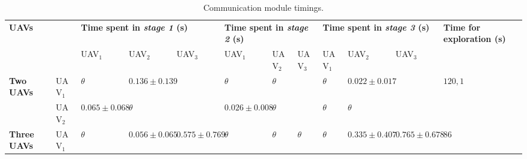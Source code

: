 \documentclass[11pt,openany]{book}
\begin{document}
\begin{table}[H]
    \centering
    \small
    \caption{Communication module timings.}
    \label{tab:4.4}
    \begin{tabular}{|p{0.8cm}|p{0.7cm}|p{0.7cm}|p{0.7cm}|p{0.7cm}|p{0.7cm}|p{0.7cm}|p{0.7cm}|p{0.7cm}|p{0.7cm}|p{0.7cm}|p{1cm}|}\hline
        \multicolumn{2}{|l|}{\multirow{2}{1cm}{\textbf{UAVs}}} & \multicolumn{3}{|p{2.1cm}|}{\textbf{Time spent in \textit{stage 1} (s)}} & \multicolumn{3}{|p{2.1cm}|}{\textbf{Time spent in \textit{stage 2} (s)}} & \multicolumn{3}{|p{2.1cm}|}{\textbf{Time spent in \textit{stage 3} (s)}} & \textbf{Time for exploration (s)}                                                                                                                      \\\cline{3-11}
        \multicolumn{2}{|l|}{}                                 & UAV$_1$                                                                  & UAV$_2$                                                                  & UAV$_3$                                                                  & UAV$_1$                           & UAV$_2$           & UAV$_3$  & UAV$_1$  & UAV$_2$  & UAV$_3$           &                                           \\\hline
        \multirow{2}{0.8cm}{\textbf{Two UAVs}}                 & UAV$_1$                                                                  & $\theta$                                                                 & $0.136\pm 0.139$                                                         &                                   & $\theta$          & $\theta$ &          & $\theta$ & $0.022 \pm 0.017$ &                   & $120,1$               \\\cline{2-11}
                                                               & UAV$_2$                                                                  & $0.065 \pm 0.068$                                                        & $\theta$                                                                 &                                   & $0.026 \pm 0.008$ & $\theta$ &          & $\theta$ & $\theta$          &                   &                       \\\hline
        \multirow{3}{0.8cm}{\textbf{Three UAVs}}               & UAV$_1$                                                                  & $\theta$                                                                 & $0.056 \pm 0.065$                                                        & $0.575 \pm 0.769$                 & $\theta$          & $\theta$ & $\theta$ & $\theta$ & $0.335 \pm 0.407$ & $0.765 \pm 0.678$ & \multirow{3}{1cm}{86} \\\cline{2-11}

\end{tabular}
\end{table}
\end{document}
